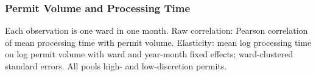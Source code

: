 \begin{frame}[label=permit-vol-corr-appendix]
    \frametitle{Permit Volume and Processing Time}
    \begin{center}
    \setlength{\tabcolsep}{8pt}
    \renewcommand{\arraystretch}{1.2}
    
    \end{center}
    \vspace{0.5em}
    {\small Each observation is one ward in one month. Raw correlation: Pearson correlation of mean processing time with permit volume. Elasticity: mean log processing time on log permit volume with ward and year-month fixed effects; ward-clustered standard errors. All pools high- and low-discretion permits.}
    \vfill
    \hfill\hyperlink{permit-stats-main}{}
\end{frame}
